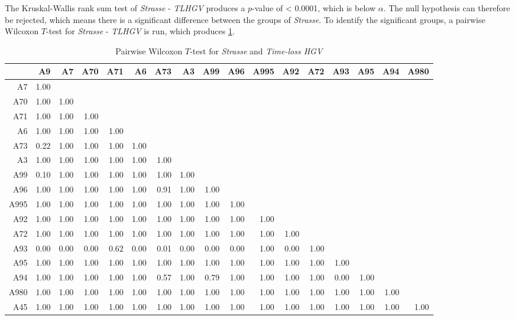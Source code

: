 The Kruskal-Wallis rank sum test of \textit{Strasse} - \textit{TLHGV} produces a $p$-value of < 0.0001, which is below $\alpha$. The null hypothesis can therefore be rejected, which means there is a significant difference between the groups of \textit{Strasse}. To identify the significant groups, a pairwise Wilcoxon $T$-test for \textit{Strasse} - \textit{TLHGV} is run, which produces \cref{tbl:wilcoxon_arbis_matched_Strasse_TLHGV}. 
\begin{table}[ht!]
	\tiny
	\setlength{\tabcolsep}{4pt}
	\centering
  \begin{tabular}{rrrrrrrrrrrrrrrrr}
    \hline
         & A9 & A7 & A70 & A71 & A6 & A73 & A3 & A99 & A96 & A995 & A92 & A72 & A93 & A95 & A94 & A980 \\ 
    \hline
    A7   & 1.00 &  &  &  &  &  &  &  &  &  &  &  &  &  &  &  \\ 
    A70  & 1.00 & 1.00 &  &  &  &  &  &  &  &  &  &  &  &  &  &  \\ 
    A71  & 1.00 & 1.00 & 1.00 &  &  &  &  &  &  &  &  &  &  &  &  &  \\ 
    A6   & 1.00 & 1.00 & 1.00 & 1.00 &  &  &  &  &  &  &  &  &  &  &  &  \\ 
    A73  & 0.22 & 1.00 & 1.00 & 1.00 & 1.00 &  &  &  &  &  &  &  &  &  &  &  \\ 
    A3   & 1.00 & 1.00 & 1.00 & 1.00 & 1.00 & 1.00 &  &  &  &  &  &  &  &  &  &  \\ 
    A99  & 0.10 & 1.00 & 1.00 & 1.00 & 1.00 & 1.00 & 1.00 &  &  &  &  &  &  &  &  &  \\ 
    A96  & 1.00 & 1.00 & 1.00 & 1.00 & 1.00 & 0.91 & 1.00 & 1.00 &  &  &  &  &  &  &  &  \\ 
    A995 & 1.00 & 1.00 & 1.00 & 1.00 & 1.00 & 1.00 & 1.00 & 1.00 & 1.00 &  &  &  &  &  &  &  \\ 
    A92  & 1.00 & 1.00 & 1.00 & 1.00 & 1.00 & 1.00 & 1.00 & 1.00 & 1.00 & 1.00 &  &  &  &  &  &  \\ 
    A72  & 1.00 & 1.00 & 1.00 & 1.00 & 1.00 & 1.00 & 1.00 & 1.00 & 1.00 & 1.00 & 1.00 &  &  &  &  &  \\ 
    A93  & 0.00 & 0.00 & 0.00 & 0.62 & 0.00 & 0.01 & 0.00 & 0.00 & 0.00 & 1.00 & 0.00 & 1.00 &  &  &  &  \\ 
    A95  & 1.00 & 1.00 & 1.00 & 1.00 & 1.00 & 1.00 & 1.00 & 1.00 & 1.00 & 1.00 & 1.00 & 1.00 & 1.00 &  &  &  \\ 
    A94  & 1.00 & 1.00 & 1.00 & 1.00 & 1.00 & 0.57 & 1.00 & 0.79 & 1.00 & 1.00 & 1.00 & 1.00 & 0.00 & 1.00 &  &  \\ 
    A980 & 1.00 & 1.00 & 1.00 & 1.00 & 1.00 & 1.00 & 1.00 & 1.00 & 1.00 & 1.00 & 1.00 & 1.00 & 1.00 & 1.00 & 1.00 &  \\ 
    A45  & 1.00 & 1.00 & 1.00 & 1.00 & 1.00 & 1.00 & 1.00 & 1.00 & 1.00 & 1.00 & 1.00 & 1.00 & 1.00 & 1.00 & 1.00 & 1.00 \\ 
    \hline
  \end{tabular}
	\caption{Pairwise Wilcoxon $T$-test for \textit{Strasse} and \textit{Time-loss HGV}}
	\label{tbl:wilcoxon_arbis_matched_Strasse_TLHGV}
\end{table}
